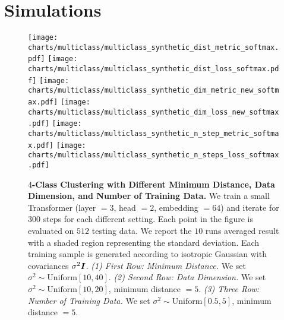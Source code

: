 \section{Simulations}\label{sect4}

\begin{figure}[!h]
        \texttt{[image: charts/multiclass/multiclass\_synthetic\_dist\_metric\_softmax.pdf]}
    \endminipage\hfill
        \texttt{[image: charts/multiclass/multiclass\_synthetic\_dist\_loss\_softmax.pdf]}
    \endminipage\hfill
\endminipage\hfill
{}
        \texttt{[image: charts/multiclass/multiclass\_synthetic\_dim\_metric\_new\_softmax.pdf]}
    \endminipage\hfill
        \texttt{[image: charts/multiclass/multiclass\_synthetic\_dim\_loss\_new\_softmax.pdf]}
    \endminipage\hfill
\endminipage\hfill
{}
        \texttt{[image: charts/multiclass/multiclass\_synthetic\_n\_step\_metric\_softmax.pdf]}
    \endminipage\hfill
        \texttt{[image: charts/multiclass/multiclass\_synthetic\_n\_steps\_loss\_softmax.pdf]}
    \endminipage\hfill
\endminipage
\vspace{-1em}
\caption{\textbf{$4$-Class Clustering with Different Minimum Distance, Data Dimension, and Number of Training Data.} 
We train a small Transformer (layer $=3$, head $=2$, embedding $= 64$) and iterate for $300$ steps for each different setting. Each point in the figure is evaluated on $512$ testing data. 
We report the $10$ runs averaged result with a shaded region representing the standard deviation.
Each training sample is generated according to isotropic Gaussian with covariances $\sigma^2 \boldsymbol{I}$.
\emph{(1) First Row: Minimum Distance.} We set $\sigma^2 \sim \mathrm{Uniform}[10,40]$.
\emph{(2) Second Row: Data Dimension.} We set $\sigma^2 \sim \mathrm{Uniform}[10,20]$, minimum distance $=5$.
\emph{(3) Three Row: Number of Training Data.} 
We set $\sigma^2 \sim \mathrm{Uniform}[0.5,5]$, minimum distance $=5$.}
\label{fig:dist_dim_step}
\end{figure}


